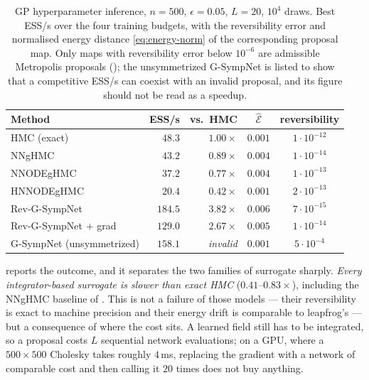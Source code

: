 \documentclass{article}
\theoremstyle{plain}
\theoremstyle{definition}
\theoremstyle{remark}
\begin{document}
\begin{table}[t]
\caption{GP hyperparameter inference, $n = 500$, $\epsilon = 0.05$, $L = 20$,
$10^4$ draws. Best ESS/s over the four training budgets, with the reversibility
error and normalised energy distance \eqref{eq:energy-norm} of the
corresponding proposal map. Only maps with reversibility error below $10^{-6}$
are admissible Metropolis proposals (); the
unsymmetrized G-SympNet is listed to show that a competitive ESS/s can coexist
with an invalid proposal, and its figure should not be read as a speedup.}
\label{tab:gp}
\vskip 0.1in
\begin{center}
\begin{small}
\begin{tabular}{lrrcc}
\toprule
Method & ESS/s & vs.\ HMC & $\widehat{\mathcal{E}}$ & reversibility \\
\midrule
HMC (exact)                 & $48.3$  & $1.00\times$ & $0.001$ & $1\cdot10^{-12}$ \\
\midrule
NNgHMC \cite{Li_2019}       & $43.2$  & $0.89\times$ & $0.004$ & $1\cdot10^{-14}$ \\
NNODEgHMC                   & $37.2$  & $0.77\times$ & $0.004$ & $1\cdot10^{-13}$ \\
HNNODEgHMC                  & $20.4$  & $0.42\times$ & $0.001$ & $2\cdot10^{-13}$ \\
\midrule
Rev-G-SympNet               & $\mathbf{184.5}$ & $\mathbf{3.82\times}$ & $0.006$ & $7\cdot10^{-15}$ \\
Rev-G-SympNet $+$ grad      & $129.0$ & $2.67\times$ & $0.005$ & $1\cdot10^{-14}$ \\
\midrule
G-SympNet (unsymmetrized)   & $158.1$ & \emph{invalid} & $0.001$ & $5\cdot10^{-4}$ \\
\bottomrule
\end{tabular}
\end{small}
\end{center}
\vskip -0.1in
\end{table}

 reports the outcome, and it separates the two families of
surrogate sharply. \emph{Every integrator-based surrogate is slower than exact
HMC} ($0.41$--$0.83\times$), including the NNgHMC baseline of \citet{Li_2019}.
This is not a failure of those models --- their reversibility is exact to
machine precision and their energy drift is comparable to leapfrog's --- but a
consequence of where the cost sits. A learned field still has to be integrated,
so a proposal costs $L$ sequential network evaluations; on a GPU, where a
$500\times500$ Cholesky takes roughly $4$\,ms, replacing the gradient with a
network of comparable cost and then calling it $20$ times does not buy
anything.
\end{document}
